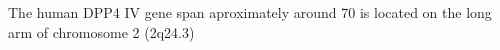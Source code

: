 The human DPP4 IV gene span aproximately around 70 is located on the long arm of chromosome 2 (2q24.3)
